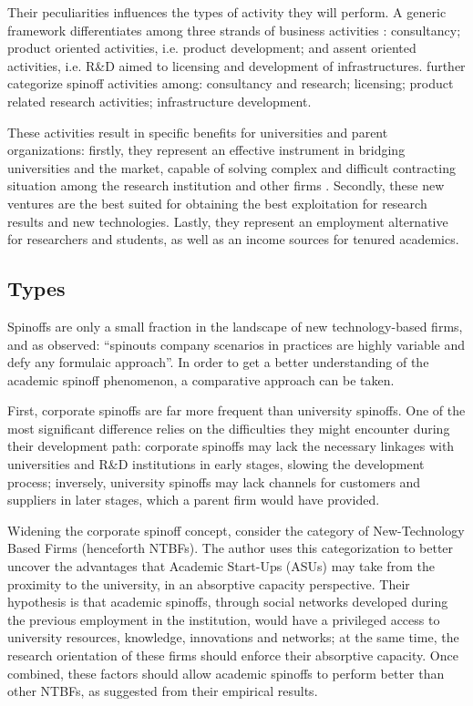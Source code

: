 Their peculiarities influences the types of activity they will perform. A generic framework differentiates among three strands of business activities \citep{Mustar2006}: consultancy; product oriented activities, i.e. product development; and assent oriented activities, i.e. R\&D aimed to licensing and development of infrastructures. \citet{Druilhe2004} further categorize spinoff activities among: consultancy and research; licensing; product related research activities; infrastructure development. 

These activities result in specific benefits for universities and parent organizations: firstly, they represent an effective instrument in bridging universities and the market, capable of solving complex and difficult contracting situation among the research institution and other firms \citep{Rizzo2015}. Secondly, these new ventures are the best suited for obtaining the best exploitation for research results and new technologies. Lastly, they represent an employment alternative for researchers and students, as well as an income sources for tenured academics.

\subsection{Types}

Spinoffs are only a small fraction in the landscape of new technology-based firms, and as \citet{Franklin2001} observed: \enquote{spinouts company scenarios in practices are highly variable and defy any formulaic approach}. In order to get a better understanding of the academic spinoff phenomenon, a comparative approach can be taken.

First, corporate spinoffs are far more frequent than university spinoffs. One of the most significant difference relies on the difficulties they might encounter during their development path: corporate spinoffs may lack the necessary linkages with universities and R\&D institutions in early stages, slowing the development process; inversely, university spinoffs may lack channels for customers and suppliers in later stages, which a parent firm would have provided.

Widening the corporate spinoff concept, \citet{Colombo2010} consider the category of New-Technology Based Firms (henceforth NTBFs). The author uses this categorization to better uncover the advantages that Academic Start-Ups (ASUs) may take from the proximity to the university, in an absorptive capacity perspective. Their hypothesis is that academic spinoffs, through social networks developed during the previous employment in the institution, would have a privileged access to university resources, knowledge, innovations and networks; at the same time, the research orientation of these firms should enforce their absorptive capacity. Once combined, these factors should allow academic spinoffs to perform better than other NTBFs, as suggested from their empirical results.

